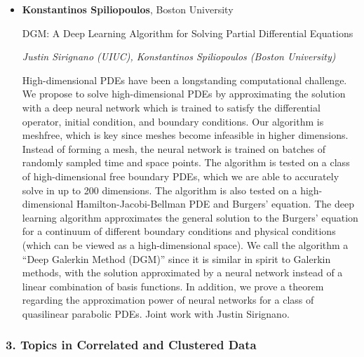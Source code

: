 \begin{itemize}
\item \textbf{Konstantinos Spiliopoulos}, Boston University

DGM: A Deep Learning Algorithm for Solving Partial Differential Equations

\emph{\footnotesize Justin Sirignano (UIUC), Konstantinos Spiliopoulos (Boston University)}

High-dimensional PDEs have been a longstanding computational challenge. We propose to solve high-dimensional PDEs by approximating the solution with a deep neural network which is trained to satisfy the differential operator, initial condition, and boundary conditions. Our algorithm is meshfree, which is key since meshes become infeasible in higher dimensions. Instead of forming a mesh, the neural network is trained on batches of randomly sampled time and space points. The algorithm is tested on a class of high-dimensional free boundary PDEs, which we are able to accurately solve in up to 200 dimensions. The algorithm is also tested on a high-dimensional Hamilton-Jacobi-Bellman PDE and Burgers' equation. The deep learning algorithm approximates the general solution to the Burgers' equation for a continuum of different boundary conditions and physical conditions (which can be viewed as a high-dimensional space). We call the algorithm a ``Deep Galerkin Method (DGM)'' since it is similar in spirit to Galerkin methods, with the solution approximated by a neural network instead of a linear combination of basis functions. In addition, we prove a theorem regarding the approximation power of neural networks for a class of quasilinear parabolic PDEs. Joint work with Justin Sirignano.

\end{itemize}

\subsubsection*{3. Topics in Correlated and Clustered Data}

